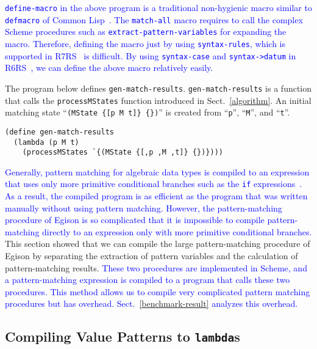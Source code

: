 \documentclass[acmlarge]{acmart}
\newcommand{\new}[1]{\textcolor{blue}{#1}}
\begin{document}
\noindent
\new{
\lstinline{define-macro} in the above program is a traditional non-hygienic macro similar to \lstinline{defmacro} of Common Lisp~\cite{gaucheTM}.
The \lstinline{match-all} macro requires to call the complex Scheme procedures such as \lstinline{extract-pattern-variables} for expanding the macro.
Therefore, defining the macro just by using \lstinline{syntax-rules}, which is supported in R7RS~\cite{shinn2013revised} is difficult.
By using \lstinline{syntax-case} and \lstinline{syntax->datum} in R6RS~\cite{sperber2009revised}, we can define the above macro relatively easily.
}%

The program below defines \lstinline{gen-match-results}.
\lstinline{gen-match-results} is a function that calls the \lstinline{processMStates} function introduced in Sect.~\ref{algorithm}.
An initial matching state ``\lstinline|(MState {[p M t]} {})|'' is created from ``\lstinline{p}'', ``\lstinline{M}'', and ``\lstinline{t}''.

\begin{lstlisting}[language=egison]
(define gen-match-results
  (lambda (p M t)
    (processMStates `{(MState {[,p ,M ,t]} {})})))
\end{lstlisting}

\medskip

\new{
Generally, pattern matching for algebraic data types is compiled to an expression that uses only more primitive conditional branches such as the \texttt{if} expressions~\cite{peyton1987implementation}.
As a result, the compiled program is as efficient as the program that was written manually without using pattern matching.  
However, the pattern-matching procedure of Egison is so complicated that it is impossible to compile pattern-matching directly to an expression only with more primitive conditional branches.
}%
This section showed that we can compile the large pattern-matching procedure of Egison by separating the extraction of pattern variables and the calculation of pattern-matching results.
\new{
These two procedures are implemented in Scheme, and a pattern-matching expression is compiled to a program that calls these two procedures.
This method allows us to compile very complicated pattern matching procedures but has overhead.
Sect.~\ref{benchmark-result} analyzes this overhead.
}%

\subsection{Compiling Value Patterns to \lstinline{lambda}s}\label{method-val-pat}
\end{document}

